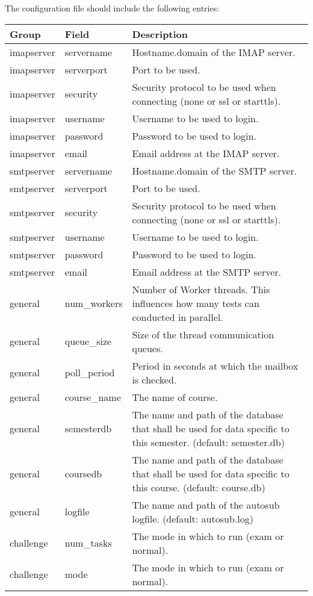 The configuration file should include the following entries:
\begin{tabular}{|p{2.5cm}|p{2.5cm}|p{8cm}|}
\hline

{\bf Group} & {\bf Field} & {\bf Description} \\
\hline
\hline
imapserver & servername & Hostname.domain of the IMAP server.\\
\hline
imapserver & serverport & Port to be used.\\
\hline
imapserver & security & Security protocol to be used when connecting 
	(none or ssl or starttls). \\
\hline
imapserver & username & Username to be used to login. \\ 
\hline
imapserver & password & Password to be used to login. \\
\hline
imapserver & email & Email address at the IMAP server. \\
\hline
\hline
smtpserver & servername & Hostname.domain of the SMTP server.\\
\hline
smtpserver & serverport & Port to be used. \\
\hline
smtpserver & security & Security protocol to be used when connecting
	(none or ssl or starttls). \\
\hline
smtpserver & username & Username to be used to login. \\
\hline
smtpserver & password & Password to be used to login. \\
\hline
smtpserver & email & Email address at the SMTP server. \\
\hline
\hline
general & num\_workers & Number of Worker threads. This influences how many
	tests can conducted in parallel. \\
\hline
general & queue\_size & Size of the thread communication queues. \\
\hline
general & poll\_period & Period in seconds at which the mailbox is checked.\\
\hline
general & course\_name & The name of course.\\
\hline
general & semesterdb & The name and path of the database that shall be used for data specific to
    this semester. (default: semester.db) \\
\hline
general & coursedb & The name and path of the database that shall be used for data specific to
    this course. (default: course.db)\\
\hline
general & logfile & The name and path of the autosub logfile. (default: autosub.log)\\
\hline
\hline
challenge & num\_tasks & The mode in which to run (exam or normal).\\
\hline
challenge & mode & The mode in which to run (exam or normal). \\ 
\hline
\end{tabular}

